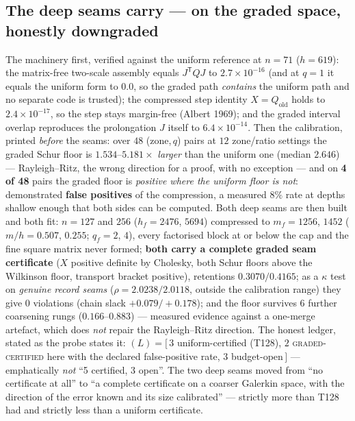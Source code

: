 \documentclass[11pt,a4paper]{article}
\begin{document}
\subsection{The deep seams carry --- on the graded space, honestly downgraded}
The machinery first, verified against the uniform reference at $n=71$ ($h=619$): the
matrix-free two-scale assembly equals $J^{\mathsf T}QJ$ to $2.7\times10^{-16}$ (and at $q=1$
it equals the uniform form to $0.0$, so the graded path \emph{contains} the uniform path and
no separate code is trusted); the compressed step identity $X=Q_{\mathrm{old}}$ holds to
$2.4\times10^{-17}$, so the step stays margin-free (Albert 1969); and the graded interval
overlap reproduces the prolongation $J$ itself to $6.4\times10^{-14}$. Then the calibration,
printed \emph{before} the seams: over $48$ (zone,\,$q$) pairs at $12$ zone/ratio settings the
graded Schur floor is $1.534$--$5.181\times$ \emph{larger} than the uniform one (median
$2.646$) --- Rayleigh--Ritz, the wrong direction for a proof, with no exception --- and on
\textbf{4 of 48} pairs the graded floor is \emph{positive where the uniform floor is not}:
demonstrated \textbf{false positives} of the compression, a measured $8\%$ rate at depths
shallow enough that both sides can be computed. Both deep seams are then built and both fit:
$n=127$ and $256$ ($h_f=2476$, $5694$) compressed to $m_f=1256$, $1452$ ($m/h=0.507$, $0.255$;
$q_f=2$, $4$), every factorised block at or below the cap and the fine square matrix never
formed; \textbf{both carry a complete graded seam certificate} ($X$ positive definite by
Cholesky, both Schur floors above the Wilkinson floor, transport bracket positive), retentions
$0.3070/0.4165$; as a $\kappa$ test on \emph{genuine record seams} ($\rho=2.0238/2.0118$,
outside the calibration range) they give $0$ violations (chain slack $+0.079/+0.178$); and the
floor survives $6$ further coarsening rungs ($0.166$--$0.883$) --- measured evidence against a
one-merge artefact, which does \emph{not} repair the Rayleigh--Ritz direction. The honest
ledger, stated as the probe states it: $(L)=[\,3$ uniform-certified (T128), $2$
\textsc{graded-certified} here with the declared false-positive rate, $3$ budget-open$\,]$ ---
emphatically \emph{not} ``5 certified, 3 open''. The two deep seams moved from ``no
certificate at all'' to ``a complete certificate on a coarser Galerkin space, with the
direction of the error known and its size calibrated'' --- strictly more than T128 had and
strictly less than a uniform certificate.
\end{document}
